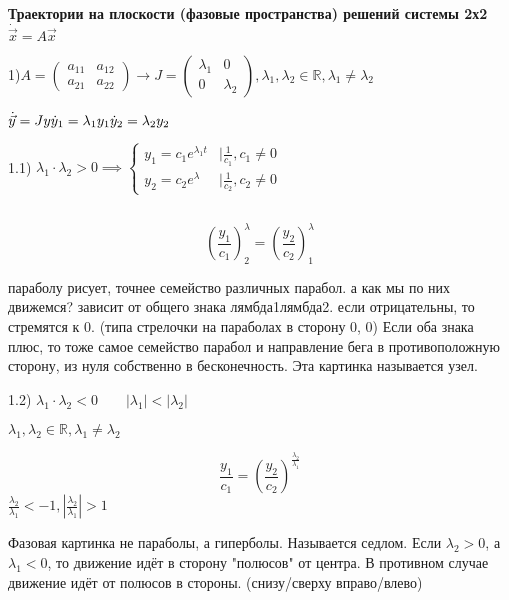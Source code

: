 \documentclass[12pt, a4paper]{article}
\begin{document}
    \par $ $
    \,\\

    \textbf{Траектории на плоскости (фазовые пространства) решений системы
    2х2}
    $\dot{\vec{x}} = A\vec{x}$

    1)$A = \begin{pmatrix}
        a_{11} & a_{12} \\ a_{21} & a_{22}
    \end{pmatrix} \to J = 
    \begin{pmatrix}
        \lambda_1 & 0 \\ 0 & \lambda_2
    \end{pmatrix}, \lambda_1, \lambda_2 \in \mathbb{R}, \lambda_1 \neq \lambda_2$


    $\dot{\vec{y}} = Jy \\ \dot y_1 = \lambda_1 y_1 \\ \dot y_2 = \lambda_2 y_2$

    1.1) $\lambda_1 \cdot \lambda_2 > 0 \implies \begin{cases}
        y_1 = c_1 e^{\lambda_1t} &\mid \frac{1}{c_1}, c_1\neq 0 \\
        y_2 = c_2 e^\lambda &\mid \frac{1}{c_2}, c_2\neq 0
    \end{cases}$

    \par $ $

    $$\left(\frac{y_1}{c_1}\right)^\lambda_2 = 
    \left( \frac{y_2}{c_2}\right)^\lambda_1$$

    параболу рисует, точнее семейство различных парабол. а как мы по них движемся?
    зависит от общего знака лямбда1лямбда2. если отрицательны, то 
    стремятся к 0. (типа стрелочки на параболах в сторону 0, 0)
    Если оба знака плюс, то тоже самое семейство парабол и направление бега 
    в противоположную сторону, из нуля собственно в бесконечность.
    Эта картинка называется узел.

    1.2) $\lambda_1 \cdot \lambda_2 < 0 \qquad |\lambda_1| < |\lambda_2|$
    
    $\lambda_1, \lambda_2 \in \mathbb{R}, \lambda_1 \neq \lambda_2$

    $$\frac{y_1}{c_1} = 
    \left(\frac{y_2}{c_2}\right)^{\frac{\lambda_2}{\lambda_1}}$$
    $\frac{\lambda_2}{\lambda_1} < -1, |\frac{\lambda_2}{\lambda_1}| > 1$

    Фазовая картинка не параболы, а гиперболы. Называется седлом. 
    Если $\lambda_2 > 0$, а $\lambda_1 < 0$, то движение идёт в 
    сторону "полюсов" от центра. В противном случае движение
    идёт от полюсов в стороны.  (снизу/сверху вправо/влево)
\end{document}
